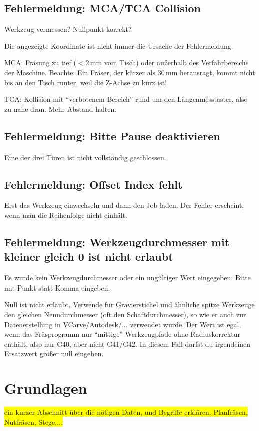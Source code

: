 \documentclass{\basedir/fablab-document}
\renewcommand{\todo}[1]{\colorbox{yellow}{{#1}}}
\begin{document}
\subsection{Fehlermeldung: MCA/TCA Collision}
Werkzeug vermessen? Nullpunkt korrekt?

Die angezeigte Koordinate ist nicht immer die Ursache der Fehlermeldung.

MCA: Fräsung zu tief ($<2$\,mm vom Tisch) oder außerhalb des Verfahrbereichs der Maschine. Beachte: Ein Fräser, der kürzer als 30\,mm herausragt, kommt nicht bis an den Tisch runter, weil die Z-Achse zu kurz ist!

TCA: Kollision mit \enquote{verbotenem Bereich} rund um den Längenmesstaster, also zu nahe dran. Mehr Abstand halten.

\subsection{Fehlermeldung: Bitte Pause deaktivieren}
Eine der drei Türen ist nicht vollständig geschlossen.

\subsection{Fehlermeldung: Offset Index fehlt}
Erst das Werkzeug einwechseln und dann den Job laden. Der Fehler erscheint, wenn man die Reihenfolge nicht einhält.

\subsection{Fehlermeldung: Werkzeugdurchmesser mit kleiner gleich 0 ist nicht erlaubt}
Es wurde kein Werkzeugdurchmesser oder ein ungültiger Wert eingegeben. Bitte mit Punkt statt Komma eingeben.

Null ist nicht erlaubt. Verwende für Gravierstichel und ähnliche spitze Werkzeuge den gleichen Nenndurchmesser (oft den Schaftdurchmesser), so wie er auch zur Datenerstellung in VCarve/Autodesk/... verwendet wurde. Der Wert ist egal, wenn das Fräsprogramm nur \enquote{mittige} Werkzeugpfade ohne Radiuskorrektur enthält, also nur G40, aber nicht G41/G42. In diesem Fall darfst du irgendeinen Ersatzwert größer null eingeben.

\section{Grundlagen}
\todo{ein kurzer Abschnitt über die nötigen Daten, und Begriffe erklären. Planfräsen, Nutfräsen, Stege,...}
\end{document}
